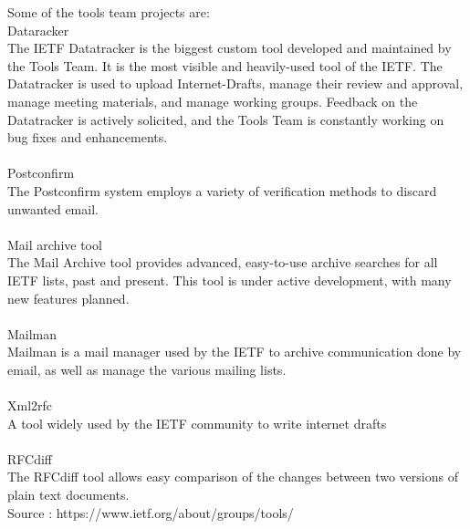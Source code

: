\documentclass{report}
\begin{document}
Some of the tools team projects are: \\
Dataracker\\
The IETF Datatracker is the biggest custom tool developed and maintained by the Tools Team. It is the most visible and heavily-used tool of the IETF. The Datatracker is used to upload Internet-Drafts, manage their review and approval, manage meeting materials, and manage working groups. Feedback on the Datatracker is actively solicited, and the Tools Team is constantly working on bug fixes and enhancements.\\
\\Postconfirm\\
The Postconfirm system employs a variety of verification methods to discard unwanted email.\\
\\Mail archive tool\\
The Mail Archive tool provides advanced, easy-to-use archive searches for all IETF lists, past and present. This tool is under active development, with many new features planned.\\
\\Mailman\\
Mailman is a mail manager used by the IETF to archive communication done by email, as well as manage the various mailing lists.\\
\\Xml2rfc\\
A tool widely used by the IETF community to write internet drafts \\
\\RFCdiff\\
The RFCdiff tool allows easy comparison of the changes between two versions of plain text documents.\\

Source : https://www.ietf.org/about/groups/tools/
\end{document}
